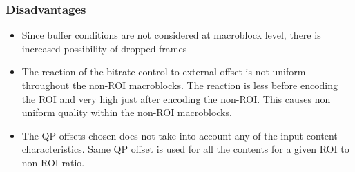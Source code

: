 \documentclass[11pt]{article} %
\begin{document}
\subsubsection*{Disadvantages}
\begin{itemize}
\item Since buffer conditions are not considered at macroblock level, there is increased possibility of dropped frames
\item The reaction of the bitrate control to external offset is not uniform throughout the non-ROI macroblocks. The reaction is less before encoding the ROI and very high just after encoding the non-ROI. This causes non uniform quality within the non-ROI macroblocks. 
\item The QP offsets chosen does not take into account any of the input content characteristics. Same QP offset is used for all the contents for a given ROI to non-ROI ratio.
\end{itemize}
%
\end{document}
